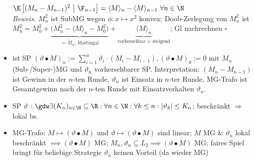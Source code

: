 \begin{itemize}
		$\E\left[(M_n-M_{n-1})^2~\big|~\F_{n-1}\right]=\langle M\rangle_n-\langle M\rangle_{n-1}~\forall n\in\N$\\
		\textit{Beweis.} $M_n^2$ ist SubMG wegen $\phi:x\mapsto x^2$ konvex; Doob-Zerlegung von $M_n^2$ ist\\
		$M_n^2=M_0^2+\underbrace{\big(M_n^2-\langle M\rangle_n-M_0^2\big)}_{=\tilde{M}_n\text{, Martingal}}+\underbrace{\langle M\rangle_n}_{\text{vorhersehbar + steigend}}$; Gl nachrechnen $\square$
		\item {} ist SP $(\vartheta\bullet M)_n:=\sum\limits_{i=1}^n\vartheta_i\cdot(M_i-M_{i-1}),(\vartheta\bullet M)_0:=0$
		mit $M_n$ (Sub-/Super-)MG und $\vartheta_n$ vorhersehbarer SP. Interpretation: $(M_n-M_{n-1})$ ist Gewinn in der $n$-ten Runde, $\vartheta_n$ ist Einsatz in $n$-ter Runde, MG-Trafo ist Gesamtgewinn nach der $n$-ten Runde mit Einsatzverhalten $\vartheta_n$.
		\item SP $\vartheta$  $:\gdw\exists(K_n)_{n\in\N}\subseteq\R:\forall n\in\N:\forall k\leq n:|\vartheta_k|\leq K_n$; beschränkt $\Rightarrow$ lokal bs.
		\item MG-Trafo: $M\mapsto(\vartheta\bullet M)$ und $\vartheta\mapsto(\vartheta\bullet M)$ sind linear; $M$ MG \& $\vartheta_n$ lokal beschränkt $\implies(\vartheta\bullet M)$ MG; $M_n,\vartheta_n\subseteq L_2\implies(\vartheta\bullet M)$ MG; faires Spiel bringt für beliebige Strategie $\vartheta_n$  keinen Vorteil (da wieder MG)
	\end{itemize}
	
